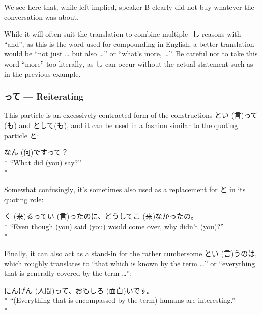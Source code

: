 \documentclass[11pt, b5paper, twoside, openright, onecolumn]{book}
\makeatletter
\newcommand*{\rubystack}[2]{{\relscale{0.5}%
  \begin{tabular}[b]{@{}c@{}}%
    {#1}\\%
   {\textscale{2}{#2}}%
  \end{tabular}}%
}
\DeclareRobustCommand*{\ruby}[2]{%
  \mbox{%
    \setlength{\parskip}{0ex}%
    \BeginAccSupp{method=pdfstringdef,ActualText={#1}}%
      \rubystack{\phantom{#2}}{#1}%
      \llap{%
        \rubystack{#2}{\phantom{#1}}%
      }%
    \EndAccSupp{}%
  }%
}
\renewcommand*{\ruby}[2]{#2 (#1)}%
\newenvironment{exampleblock}{
\setlength{\parindent}{0.6in}
\begin{minipage}[t]{\dimexpr\textwidth-\parindent}}
{\end{minipage}}
\makeatother
\begin{document}
We see here that‚ while left implied‚ speaker B clearly did not buy whatever the conversation was about.

While it will often suit the translation to combine multiple -し reasons with “and”‚ as this is the word used for compounding in English‚ a better translation would be “not just … but also …” or “what’s more‚ …”. Be careful not to take this word “more” too literally‚ as し can occur without the actual statement such as in the previous example.

\subsubsection{って — Reiterating}

This particle is an excessively contracted form of the constructions と\ruby{言}{い}って(も) and として(も)‚ and it can be used in a fashion similar to the quoting particle と:

\vspace{0.4cm}
\begin{exampleblock}
\ruby{何}{なん}ですって？ \\* 
“What did (you) say?” \\* 
\end{exampleblock}
\vspace{0.2cm}

Somewhat confusingly‚ it’s sometimes also used as a replacement for と in its quoting role:

\vspace{0.4cm}
\begin{exampleblock}
\ruby{来}{く}るって\ruby{言}{い}ったのに、どうして\ruby{来}{こ}なかったの。 \\* 
“Even though (you) said (you) would come over‚ why didn’t (you)?” \\* 
\end{exampleblock}
\vspace{0.2cm}

Finally‚ it can also act as a stand-in for the rather cumbersome と\ruby{言}{い}うのは‚ which roughly translates to “that which is known by the term …” or “everything that is generally covered by the term …”:

\vspace{0.4cm}
\begin{exampleblock}
\ruby{人間}{にんげん}って、\ruby{面白}{おもしろ}いです。 \\* 
“(Everything that is encompassed by the term) humans are interesting.” \\* 
\end{exampleblock}
\end{document}

